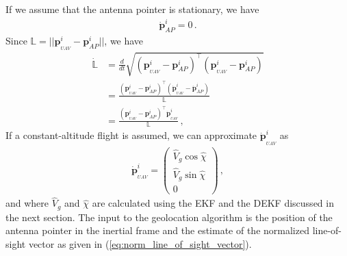 If we assume that the antenna pointer is stationary, we have
\begin{align*}
\boldsymbol{\dot{p}}_{AP}^i=0\,.
\end{align*}
Since $\mathbb{L}=\lvert\lvert \boldsymbol{p}_{_{UAV}}^i-\boldsymbol{p}_{AP}^i\rvert\rvert$, we have
\begin{align*}
\mathbb{\dot{L}}&=\frac{d}{dt}\sqrt{(\boldsymbol{p}_{_{UAV}}^i-\boldsymbol{p}_{AP}^i)^\top(\boldsymbol{p}_{_{UAV}}^i-\boldsymbol{p}_{AP}^i)} \\
&=\frac{(\boldsymbol{p}_{_{UAV}}^i-\boldsymbol{p}_{AP}^i)^\top(\dot{\boldsymbol{p}}_{_{UAV}}^i-\dot{\boldsymbol{p}}_{AP}^i)}{\mathbb{L}} \\
&=\frac{(\boldsymbol{p}_{_{UAV}}^i-\boldsymbol{p}_{AP}^i)^\top\dot{\boldsymbol{p}}_{_{UAV}}^i}{\mathbb{L}}\,,
\end{align*}
If a constant-altitude flight is assumed, we can approximate  $\dot{\boldsymbol{p}}_{_{UAV}}^i$ as
\begin{align*}
\dot{\boldsymbol{p}}_{_{UAV}}^i=
\begin{pmatrix}
\hat{V}_g\cos\hat{\chi} \\
\hat{V}_g\sin\hat{\chi} \\
0
\end{pmatrix}\,,
\end{align*}
and where $\hat{V}_g$ and $\hat{\chi}$ are calculated using the EKF and the DEKF discussed in the next section. The input to the geolocation algorithm is the position of the antenna pointer in the inertial frame and the estimate of the normalized line-of-sight vector as given in (\ref{eq:norm_line_of_sight_vector}).

